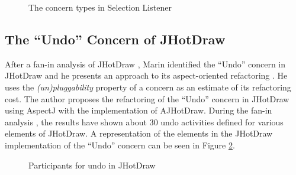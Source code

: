 \begin{figure}[H]
	\centering
  	\caption{The concern types in Selection Listener \cite{marin2005approach}}
  	\label{fig:Concerns_Selection_Listener}
\end{figure}

\subsection{The ``Undo'' Concern of JHotDraw}\label{The Undo Concern of JHotDraw}
After a fan-in analysis of JHotDraw \cite{marin2004identifying}, Marin identified the  ``Undo'' concern in JHotDraw and he presents an approach to its aspect-oriented refactoring \cite{marin2004refactoring}. 
He uses the \textit{(un)pluggability} property of a concern as an estimate of its refactoring cost. 
The author proposes the refactoring of the ``Undo'' concern in JHotDraw using AspectJ with the implementation of AJHotDraw. 
During the fan-in analysis \cite{marin2004identifying}, the results have shown about 30 undo activities defined for various elements of JHotDraw. 
A representation of the elements in the JHotDraw implementation of the ``Undo'' concern can be seen in Figure \ref{fig:Participants_for_undo_in_JHotDraw}.

\begin{figure}[H]
	\centering
  	\caption{Participants for undo in JHotDraw \cite{marin2004refactoring}}
  	\label{fig:Participants_for_undo_in_JHotDraw}
\end{figure}

